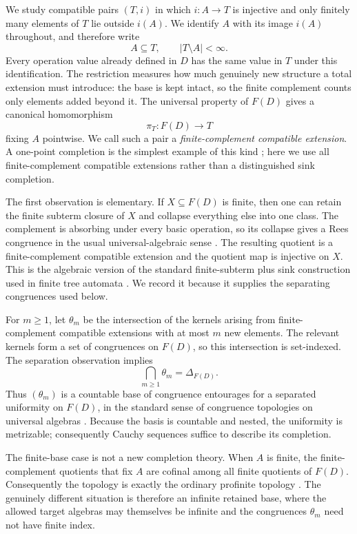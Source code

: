 \documentclass{birkau}
\theoremstyle{definition}
\theoremstyle{remark}
\begin{document}
We study compatible pairs $(T,i)$ in which $i:A\to T$ is injective and only
finitely many elements of $T$ lie outside $i(A)$.  We identify $A$ with its
image $i(A)$ throughout, and therefore write
\[
 A\subseteq T,
 \qquad |T\setminus A|<\infty.
\]
Every operation value already defined in $D$ has the same value in $T$ under
this identification.  The restriction measures how much genuinely new
structure a total extension must introduce: the base is kept intact, so the
finite complement counts only elements added beyond it.  The universal property
of $F(D)$ gives a canonical homomorphism
\[
 \pi_T:F(D)\longrightarrow T
\]
fixing $A$ pointwise.  We call such a pair a \emph{finite-complement compatible
extension}.  A one-point completion is the simplest example of this kind
\cite{Nesin2011}; here we use all finite-complement compatible extensions rather
than a distinguished sink completion.

The first observation is elementary.  If $X\subseteq F(D)$ is finite, then one
can retain the finite subterm closure of $X$ and collapse everything else into
one class.  The complement is absorbing under every basic operation, so its
collapse gives a Rees congruence in the usual universal-algebraic sense
\cite{Tichy1981}.  The resulting quotient is a finite-complement compatible
extension and the quotient map is injective on $X$.  This is the algebraic
version of the standard finite-subterm plus sink construction used in finite
tree automata \cite{ComonEtAl2008}.  We record it because it supplies the
separating congruences used below.

For $m\ge1$, let $\theta_m$ be the intersection of the kernels arising from
finite-complement compatible extensions with at most $m$ new elements.  The
relevant kernels form a set of congruences on $F(D)$, so this intersection is
set-indexed.  The separation observation implies
\[
 \bigcap_{m\ge1}\theta_m=\Delta_{F(D)}.
\]
Thus $(\theta_m)$ is a countable base of congruence entourages for a separated
uniformity on $F(D)$, in the standard sense of congruence topologies on
universal algebras \cite{BulmanFleming1971}.  Because the basis is countable and
nested, the uniformity is metrizable; consequently Cauchy sequences suffice to
describe its completion.

The finite-base case is not a new completion theory.  When $A$ is finite, the
finite-complement quotients that fix $A$ are cofinal among all finite quotients
of $F(D)$.  Consequently the topology is exactly the ordinary profinite
topology \cite{DaveyGouveiaHaviarPriestley2011,ChenAdamekMiliusUrbat2016}.
The genuinely different situation is therefore an infinite retained base,
where the allowed target algebras may themselves be infinite and the
congruences $\theta_m$ need not have finite index.
\end{document}
